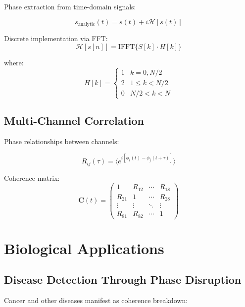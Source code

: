 \documentclass[12pt,twocolumn]{article}
\begin{document}
Phase extraction from time-domain signals:

\begin{equation}
s_{\text{analytic}}(t) = s(t) + i\mathcal{H}[s(t)]
\end{equation}

Discrete implementation via FFT:
\begin{equation}
\mathcal{H}[s[n]] = \text{IFFT}\{S[k] \cdot H[k]\}
\end{equation}

where:
\begin{equation}
H[k] = \begin{cases}
1 & k = 0, N/2 \\
2 & 1 \leq k < N/2 \\
0 & N/2 < k < N
\end{cases}
\end{equation}

\subsection{Multi-Channel Correlation}

Phase relationships between channels:

\begin{equation}
R_{ij}(\tau) = \langle e^{i[\phi_i(t) - \phi_j(t+\tau)]} \rangle
\end{equation}

Coherence matrix:
\begin{equation}
\mathbf{C}(t) = \begin{pmatrix}
1 & R_{12} & \cdots & R_{18} \\
R_{21} & 1 & \cdots & R_{28} \\
\vdots & \vdots & \ddots & \vdots \\
R_{81} & R_{82} & \cdots & 1
\end{pmatrix}
\end{equation}

\section{Biological Applications}

\subsection{Disease Detection Through Phase Disruption}

Cancer and other diseases manifest as coherence breakdown:
\end{document}
